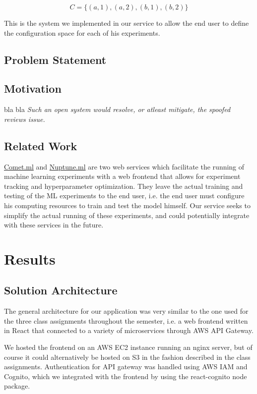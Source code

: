 \documentclass[12pt,oneside]{amsart}
\makeatletter
\newcommand*\ie{i.e.\@\xspace}
\makeatother
\begin{document}
\begin{multicols}{2}
\[
C = \{(a, 1), (a, 2), (b, 1), (b, 2)\}
\]

This is the system we implemented in our service to allow the end user to define the configuration space for each of his experiments.

\subsection{Problem Statement} \label{ch:problem_statement}

\subsection{Motivation} \label{ch:motivation}
bla bla \textit{Such an open system would resolve, or atleast mitigate, the spoofed reviews issue.}

\subsection{Related Work} \label{ch:previous}
\href{https://comet.ml/}{Comet.ml} and \href{https://neptune.ml/}{Nuptune.ml} are two web services which facilitate the running of machine learning experiments with a web frontend that allows for experiment tracking and hyperparameter optimization.
They leave the actual training and testing of the ML experiments to the end user, \ie the end user must configure his computing resources to train and test the model himself.
Our service seeks to simplify the actual running of these experiments, and could potentially integrate with these services in the future.

\section{Results} \label{ch:results}
\subsection{Solution Architecture}
The general architecture for our application was very similar to the one used for the three class assignments throughout the semester,
\ie a web frontend written in React that connected to a variety of microservices through AWS API Gateway.

We hosted the frontend on an AWS EC2 instance running an nginx server, but of course it could alternatively be hosted on S3 in the fashion described in the class assignments.
Authentication for API gateway was handled using AWS IAM and Cognito, which we integrated with the frontend by using the react-cognito node package.


\end{multicols}
\end{document}

